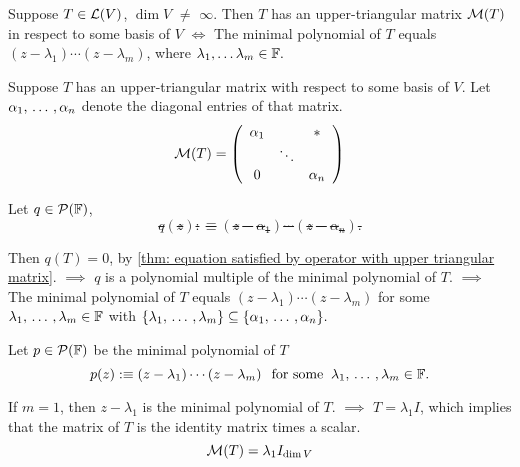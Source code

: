 \setcounter{thm}{43}
\begin{thm}
  \label{thm: necessary and sufficient condition to have an upper-triangular-matrix}
  Suppose $T\in \mathcal{L}(V)$, $\dim V$ $\neq$ $\infty$.
  Then $T$ has an upper-triangular matrix $\mathcal{M}(T)$ in respect to some basis of $V$ $\iff$ The minimal polynomial of $T$ equals $(z-\lambda_1) \cdots (z-\lambda_m)$, where $\lambda_1, \dots \lambda_m \in \mathbb{F}.$

\end{thm}
\begin{prf}
   Suppose $T$ has an upper-triangular matrix with respect to some basis of $V$. Let $\alpha_1, {\, \ldots \,\,}, \alpha_n$ denote the diagonal entries of that matrix.
  \begin{equation}
  \mmatrix(T) =
  \left( {\begin{array}{ccc}
      \alpha_1 &         &  \mathlarger{*} \\
      &  \ddots &    \\
      0      &         & \alpha_n
  \end{array} } \right)
  \end{equation}

  Let $q\in \mathcal{P}(\mathbb{F})$, \st
  \begin{equation}
    q(z) :\equiv (z-\alpha_1) \cdots (z-\alpha_n).
  \end{equation}

  Then $q(T) = 0$, by \ref{thm: equation satisfied by operator with upper triangular matrix}. $\implies$ $q$ is a polynomial multiple of the minimal polynomial of $T$. $\implies$ The minimal polynomial of $T$ equals $(z-\lambda_1) \cdots (z-\lambda_m)$ for some $\lambda_1, {\, \ldots \,\,}, \lambda_m \in \mathbb{F}$ with $\{ \lambda_1 , {\, \ldots \,\,}, \lambda_m \} \subseteq \{\alpha_1, {\, \ldots \,\,}, \alpha_n \}.$

   Let $p \in \mathcal{P}(\mathbb{F})$ be the minimal polynomial of $T$ \st
  \begin{equation}
    \label{eq: definition of the minimal polynomial}
    p(z) :\equiv (z-\lambda_1) \cdots (z-\lambda_m) \;\;\, \text{for some}\;\; \lambda_1, {\, \ldots \,\,}, \lambda_m \in \mathbb{F}.
  \end{equation}

  If $m=1$, then $z-\lambda_1$ is the minimal polynomial of $T$. $\implies$ $T=\lambda_1I$, which implies that the matrix of $T$ is the identity matrix times a scalar.
  \begin{equation}
    \mathcal{M}(T) = \lambda_1 I_{\dim V}
  \end{equation}


\end{prf}
